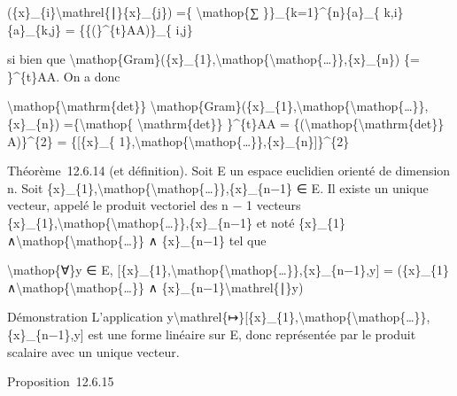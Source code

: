 \documentclass[]{article}
\begin{document}
(\{x\}\_\{i\}\textbackslash{}mathrel\{∣\}\{x\}\_\{j\}) =\{
\textbackslash{}mathop\{∑ \}\}\_\{k=1\}\^{}\{n\}\{a\}\_\{
k,i\}\{a\}\_\{k,j\} = \{\{(\}\^{}\{t\}AA)\}\_\{ i,j\}

si bien que
\textbackslash{}mathop\{Gram\}(\{x\}\_\{1\},\textbackslash{}mathop\{\textbackslash{}mathop\{\ldots{}\}\},\{x\}\_\{n\})
\{= \}\^{}\{t\}AA. On a donc

\textbackslash{}mathop\{\textbackslash{}mathrm\{det\}\}
\textbackslash{}mathop\{Gram\}(\{x\}\_\{1\},\textbackslash{}mathop\{\textbackslash{}mathop\{\ldots{}\}\},\{x\}\_\{n\})
=\{\textbackslash{}mathop\{ \textbackslash{}mathrm\{det\}\}
\}\^{}\{t\}AA =
\{(\textbackslash{}mathop\{\textbackslash{}mathrm\{det\}\} A)\}\^{}\{2\}
= \{{[}\{x\}\_\{
1\},\textbackslash{}mathop\{\textbackslash{}mathop\{\ldots{}\}\},\{x\}\_\{n\}{]}\}\^{}\{2\}

Théorème~12.6.14 (et définition). Soit E un espace euclidien orienté de
dimension n. Soit
\{x\}\_\{1\},\textbackslash{}mathop\{\textbackslash{}mathop\{\ldots{}\}\},\{x\}\_\{n−1\}
∈ E. Il existe un unique vecteur, appelé le produit vectoriel des n − 1
vecteurs
\{x\}\_\{1\},\textbackslash{}mathop\{\textbackslash{}mathop\{\ldots{}\}\},\{x\}\_\{n−1\}
et noté \{x\}\_\{1\}
∧\textbackslash{}mathop\{\textbackslash{}mathop\{\ldots{}\}\} ∧
\{x\}\_\{n−1\} tel que

\textbackslash{}mathop\{∀\}y ∈ E,
{[}\{x\}\_\{1\},\textbackslash{}mathop\{\textbackslash{}mathop\{\ldots{}\}\},\{x\}\_\{n−1\},y{]}
= (\{x\}\_\{1\}
∧\textbackslash{}mathop\{\textbackslash{}mathop\{\ldots{}\}\} ∧
\{x\}\_\{n−1\}\textbackslash{}mathrel\{∣\}y)

Démonstration L'application
y\textbackslash{}mathrel\{↦\}{[}\{x\}\_\{1\},\textbackslash{}mathop\{\textbackslash{}mathop\{\ldots{}\}\},\{x\}\_\{n−1\},y{]}
est une forme linéaire sur E, donc représentée par le produit scalaire
avec un unique vecteur.

Proposition~12.6.15
\end{document}

